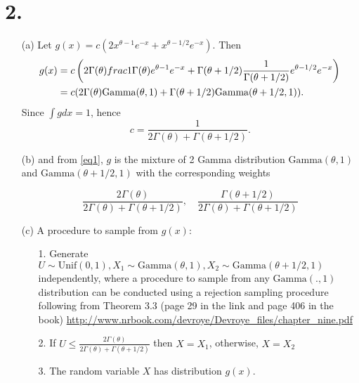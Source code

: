 \documentclass{article}\usepackage[]{graphicx}\usepackage[]{color}
\begin{document}
\section*{2.}
\begin{itemize}
\item[(a)] Let $g(x) = c(2x^{\theta -1} e^{-x} + x^{\theta - 1/2} e^{-x})$. Then 
\begin{align}
g(x) & = c\left(2\Gamma(\theta) frac{1}{\Gamma(\theta)}e^{\theta - 1} e^{-x} + \Gamma(\theta + 1/2) \frac{1}{\Gamma(\theta + 1/2)} e^{\theta -1/2}e^{-x}  \right)\notag\\
     & = c(2\Gamma(\theta) \mbox{Gamma}(\theta, 1) + \Gamma(\theta +1/2) \mbox{Gamma}(\theta +1/2, 1)). \label{eq1}
\end{align} 
Since $\int  g dx = 1$, hence 
\begin{equation}\label{eq2}
c = \frac{1}{2\Gamma(\theta) + \Gamma(\theta + 1/2)}.
\end{equation}
\item[(b)] and from \eqref{eq1}, $g$ is the mixture of 2 Gamma distribution  $\mbox{Gamma}(\theta, 1)$ and $\mbox{Gamma}(\theta +1/2, 1)$ with the corresponding weights 

\[
\frac{2\Gamma(\theta)}{2\Gamma(\theta) + \Gamma(\theta + 1/2)}, \quad \frac{\Gamma(\theta+1/2)}{2\Gamma(\theta) + \Gamma(\theta + 1/2)}
\]

\item[(c)] A procedure to sample from $g(x)$: 
\begin{itemize}
\item[1.] Generate $U \sim \mbox{Unif}(0,1), X_1 \sim \mbox{Gamma}(\theta, 1), X_2 \sim \mbox{Gamma}(\theta+1/2, 1)$ independently, where a procedure to sample from any $\mbox{Gamma}(., 1)$ distribution can be conducted using a rejection sampling procedure following from Theorem 3.3 (page 29 in the link and page 406 in the  book) \href{http://www.nrbook.com/devroye/Devroye_files/chapter_nine.pdf}{http://www.nrbook.com/devroye/Devroye\_files/chapter\_nine.pdf}    
\item[2.] If $U \leq \frac{2\Gamma(\theta)}{2\Gamma(\theta) + \Gamma(\theta + 1/2)}$ then $X = X_1$, otherwise, $X = X_2$
\item[3.]  The random variable $X$ has distribution $g(x)$.
\end{itemize}


\end{itemize}
\end{document}
